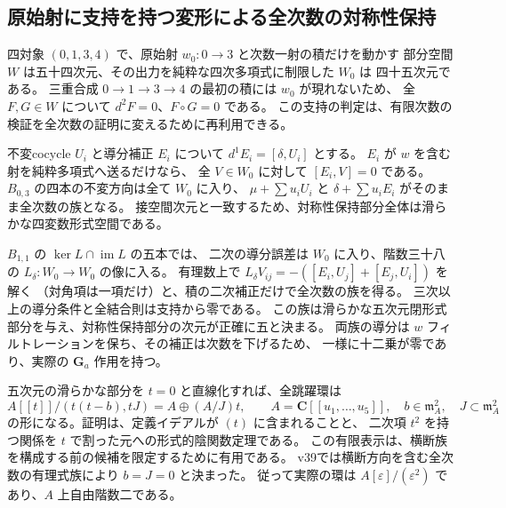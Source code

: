 \subsection{原始射に支持を持つ変形による全次数の対称性保持}

四対象 $(0,1,3,4)$ で、原始射 $w_0:0\to3$ と次数一射の積だけを動かす
部分空間 $W$ は五十四次元、その出力を純粋な四次多項式に制限した $W_0$ は
四十五次元である。
三重合成 $0\to1\to3\to4$ の最初の積には $w_0$ が現れないため、
全 $F,G\in W$ について $d^2F=0$、$F\circ G=0$ である。
この支持の判定は、有限次数の検証を全次数の証明に変えるために再利用できる。

不変cocycle $U_i$ と導分補正 $E_i$ について $d^1E_i=[\delta,U_i]$ とする。
$E_i$ が $w$ を含む射を純粋多項式へ送るだけなら、
全 $V\in W_0$ に対して $[E_i,V]=0$ である。
$B_{0,3}$ の四本の不変方向は全て $W_0$ に入り、
$\mu+\sum u_iU_i$ と $\delta+\sum u_iE_i$ がそのまま全次数の族となる。
接空間次元と一致するため、対称性保持部分全体は滑らかな四変数形式空間である。

$B_{1,1}$ の $\ker L\cap\operatorname{im}L$ の五本では、
二次の導分誤差は $W_0$ に入り、階数三十八の
$L_\delta:W_0\to W_0$ の像に入る。
有理数上で $L_\delta V_{ij}=-([E_i,U_j]+[E_j,U_i])$ を解く
（対角項は一項だけ）と、積の二次補正だけで全次数の族を得る。
三次以上の導分条件と全結合則は支持から零である。
この族は滑らかな五次元閉形式部分を与え、対称性保持部分の次元が正確に五と決まる。
両族の導分は $w$ フィルトレーションを保ち、その補正は次数を下げるため、
一様に十二乗が零であり、実際の $\mathbf G_a$ 作用を持つ。

五次元の滑らかな部分を $t=0$ と直線化すれば、全跳躍環は
\[
 A[[t]]/(t(t-b),tJ)
   =A\oplus(A/J)t,\qquad
 A=\mathbf C[[u_1,\ldots,u_5]],\quad
 b\in\mathfrak m_A^2,\quad J\subset\mathfrak m_A^2
\]
の形になる。証明は、定義イデアルが $(t)$ に含まれることと、
二次項 $t^2$ を持つ関係を $t$ で割った元への形式的陰関数定理である。
この有限表示は、横断族を構成する前の候補を限定するために有用である。
v39では横断方向を含む全次数の有理式族により $b=J=0$ と決まった。
従って実際の環は $A[\varepsilon]/(\varepsilon^2)$ であり、$A$ 上自由階数二である。
